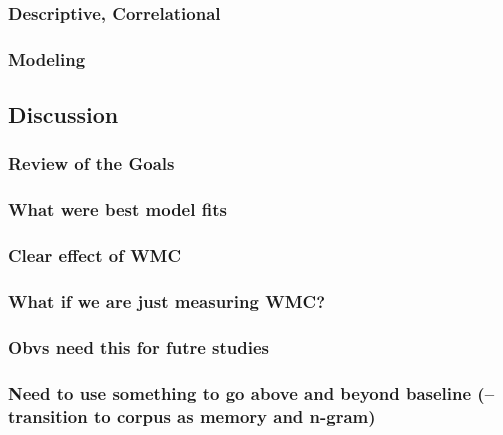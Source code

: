 \documentclass[]{book}
\theoremstyle{definition}
\theoremstyle{definition}
\theoremstyle{definition}
\theoremstyle{remark}
\begin{document}
\hypertarget{descriptive-correlational}{%
\subsubsection{Descriptive,
Correlational}\label{descriptive-correlational}}

\hypertarget{modeling}{%
\subsubsection{Modeling}\label{modeling}}

\hypertarget{discussion}{%
\subsection{Discussion}\label{discussion}}

\hypertarget{review-of-the-goals}{%
\subsubsection{Review of the Goals}\label{review-of-the-goals}}

\hypertarget{what-were-best-model-fits}{%
\subsubsection{What were best model
fits}\label{what-were-best-model-fits}}

\hypertarget{clear-effect-of-wmc}{%
\subsubsection{Clear effect of WMC}\label{clear-effect-of-wmc}}

\hypertarget{what-if-we-are-just-measuring-wmc}{%
\subsubsection{What if we are just measuring
WMC?}\label{what-if-we-are-just-measuring-wmc}}

\hypertarget{obvs-need-this-for-futre-studies}{%
\subsubsection{Obvs need this for futre
studies}\label{obvs-need-this-for-futre-studies}}

\hypertarget{need-to-use-something-to-go-above-and-beyond-baseline-transition-to-corpus-as-memory-and-n-gram}{%
\subsubsection{Need to use something to go above and beyond baseline
(--transition to corpus as memory and
n-gram)}\label{need-to-use-something-to-go-above-and-beyond-baseline-transition-to-corpus-as-memory-and-n-gram}}
\end{document}
